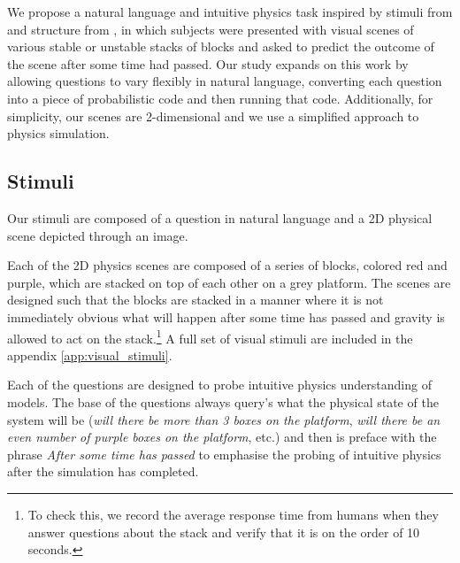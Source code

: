 \documentclass[10pt,letterpaper]{article}
\begin{document}
We propose a natural language and intuitive physics task inspired by stimuli from  and structure from , in which subjects were presented with visual scenes of various stable or unstable stacks of blocks and asked to predict the outcome of the scene after some time had passed. Our study expands on this work by allowing questions to vary flexibly in natural language, converting each question into a piece of probabilistic code and then running that code. Additionally, for simplicity, our scenes are 2-dimensional and we use a simplified approach to physics simulation.

\subsection{Stimuli}

Our stimuli are composed of a question in natural language and a 2D physical scene depicted through an image. 

Each of the 2D physics scenes are composed of a series of blocks, colored red and purple, which are stacked on top of each other on a grey platform. The scenes are designed such that the blocks are stacked in a manner where it is not immediately obvious what will happen after some time has passed and gravity is allowed to act on the stack.\footnote{To check this, we record the average response time from humans when they answer questions about the stack and verify that it is on the order of 10 seconds.} A full set of visual stimuli are included in the appendix \autoref{app:visual_stimuli}. 

Each of the questions are designed to probe intuitive physics understanding of models. The base of the questions always query's what the physical state of the system will be (\textit{will there be more than 3 boxes on the platform}, \textit{will there be an even number of purple boxes on the platform}, etc.) and then is preface with the phrase \textit{After some time has passed} to emphasise the probing of intuitive physics after the simulation has completed.
\end{document}
